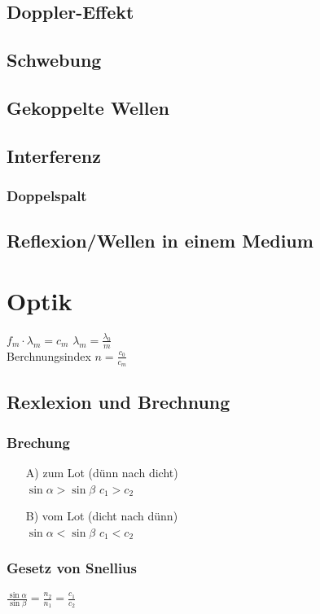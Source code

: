 \documentclass[german, 8pt]{latex4ei/latex4ei_sheet}
\begin{document}
\subsection{Doppler-Effekt}
\subsection{Schwebung}
\subsection{Gekoppelte Wellen}
\subsection{Interferenz}
\subsubsection{Doppelspalt}
\subsection{Reflexion/Wellen in einem Medium}

\section{Optik}
$f_m \cdot \lambda_m = c_m$ \qquad
$\lambda_m = \frac{\lambda_0}{m}$\\
Berchnungsindex $n=\frac{c_0}{c_m}$
\subsection{Rexlexion und Brechnung}
\subsubsection{Brechung}
\begin{enumerate}
\item[A)] zum Lot (dünn nach dicht)\\
$\sin \alpha > \sin \beta$ \qquad $c_1 > c_2$
\item[B)] vom Lot (dicht nach dünn)\\
$\sin \alpha < \sin \beta$ \qquad $c_1 < c_2$
\end{enumerate}
\subsubsection{Gesetz von Snellius}
$\frac{\sin \alpha}{\sin \beta} = \frac{n_2}{n_1} = \frac {c_1}{c_2}$
\end{document}
